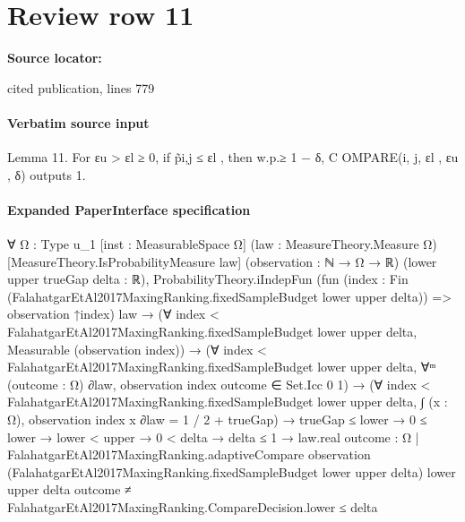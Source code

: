 \documentclass[10pt]{article}
\begin{document}
\section*{Review row 11}
\textbf{Source locator:} {\footnotesize\raggedright cited publication, lines 779\par}
\paragraph{Verbatim source input}
\begin{ReviewVerbatim}
Lemma 11. For εu > εl ≥ 0, if p̃i,j ≤ εl , then w.p.≥ 1 − δ, C OMPARE(i, j, εl , εu , δ) outputs 1.
\end{ReviewVerbatim}



\paragraph{Expanded PaperInterface specification}
\begin{ReviewVerbatim}
∀ {Ω : Type u_1} [inst : MeasurableSpace Ω] (law : MeasureTheory.Measure Ω) [MeasureTheory.IsProbabilityMeasure law]
  (observation : ℕ → Ω → ℝ) (lower upper trueGap delta : ℝ),
  ProbabilityTheory.iIndepFun
      (fun (index : Fin (FalahatgarEtAl2017MaxingRanking.fixedSampleBudget lower upper delta)) => observation ↑index)
      law →
    (∀ index < FalahatgarEtAl2017MaxingRanking.fixedSampleBudget lower upper delta, Measurable (observation index)) →
      (∀ index < FalahatgarEtAl2017MaxingRanking.fixedSampleBudget lower upper delta,
          ∀ᵐ (outcome : Ω) ∂law, observation index outcome ∈ Set.Icc 0 1) →
        (∀ index < FalahatgarEtAl2017MaxingRanking.fixedSampleBudget lower upper delta,
            ∫ (x : Ω), observation index x ∂law = 1 / 2 + trueGap) →
          trueGap ≤ lower →
            0 ≤ lower →
              lower < upper →
                0 < delta →
                  delta ≤ 1 →
                    law.real
                        {outcome : Ω |
                          FalahatgarEtAl2017MaxingRanking.adaptiveCompare observation
                              (FalahatgarEtAl2017MaxingRanking.fixedSampleBudget lower upper delta) lower upper delta
                              outcome ≠
                            FalahatgarEtAl2017MaxingRanking.CompareDecision.lower} ≤
                      delta
\end{ReviewVerbatim}
\end{document}
